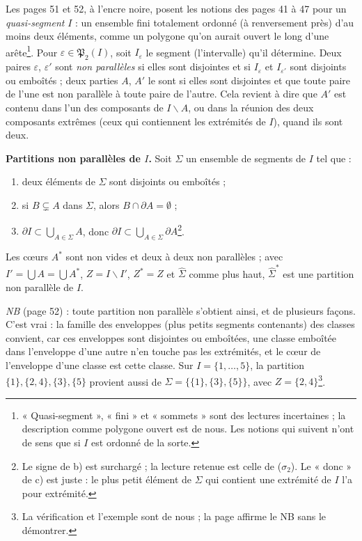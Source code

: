 \documentclass[11pt,a4paper]{article}
\begin{document}
Les pages 51 et 52, à l'encre noire, posent les notions des pages 41 à 47
pour un \emph{quasi-segment} $I$ : un ensemble fini totalement ordonné (à
renversement près) d'au moins deux éléments, comme un polygone qu'on aurait
ouvert le long d'une arête\footnote{« Quasi-segment », « fini » et
« sommets » sont des lectures incertaines ; la description comme polygone
ouvert est de nous. Les notions qui suivent n'ont de sens que si $I$ est
ordonné de la sorte.}. Pour $\varepsilon \in \mathfrak{P}_2(I)$, soit
$I_\varepsilon$ le segment (l'intervalle) qu'il détermine. Deux paires
$\varepsilon$, $\varepsilon'$ sont \emph{non parallèles} si elles sont
disjointes et si $I_\varepsilon$ et $I_{\varepsilon'}$ sont disjoints ou
emboîtés ; deux parties $A$, $A'$ le sont si elles sont disjointes et que
toute paire de l'une est non parallèle à toute paire de l'autre. Cela revient
à dire que $A'$ est contenu dans l'un des composants de $I \smallsetminus A$,
ou dans la réunion des deux composants extrêmes (ceux qui contiennent les
extrémités de $I$), quand ils sont deux.

\textbf{Partitions non parallèles de $I$.} Soit $\Sigma$ un ensemble de
segments de $I$ tel que :
\begin{enumerate}
  \item[a)] deux éléments de $\Sigma$ sont disjoints ou emboîtés ;
  \item[b)] si $B \subsetneq A$ dans $\Sigma$, alors $B \cap \partial A =
  \emptyset$ ;
  \item[c)] $\partial I \subset \bigcup_{A \in \Sigma} A$, donc $\partial I
  \subset \bigcup_{A \in \Sigma} \partial A$\footnote{Le signe de b) est
  surchargé ; la lecture retenue est celle de ($\sigma_2$). Le « donc » de c)
  est juste : le plus petit élément de $\Sigma$ qui contient une extrémité de
  $I$ l'a pour extrémité.}.
\end{enumerate}
Les cœurs $A^{*}$ sont non vides et deux à deux non parallèles ; avec $I' =
\bigcup A = \bigcup A^{*}$, $Z = I \smallsetminus I'$, $Z^{*} = Z$ et
$\widehat{\Sigma}$ comme plus haut, $\widehat{\Sigma}^{*}$ est une partition
non parallèle de $I$.

\emph{NB} (page 52) : toute partition non parallèle s'obtient ainsi, et de
plusieurs façons. C'est vrai : la famille des enveloppes (plus petits
segments contenants) des classes convient, car ces enveloppes sont
disjointes ou emboîtées, une classe emboîtée dans l'enveloppe d'une autre
n'en touche pas les extrémités, et le cœur de l'enveloppe d'une classe est
cette classe. Sur $I = \{1, \ldots, 5\}$, la partition $\{1\}, \{2, 4\},
\{3\}, \{5\}$ provient aussi de $\Sigma = \{\{1\}, \{3\}, \{5\}\}$, avec $Z =
\{2, 4\}$\footnote{La vérification et l'exemple sont de nous ; la page
affirme le NB sans le démontrer.}.
\end{document}
